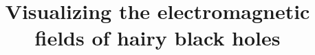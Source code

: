 \documentclass[a4paper]{article}
\title{Visualizing the electromagnetic fields of hairy black holes}
\begin{document}
\newcommand\scalemath[2]{\scalebox{#1}{\mbox{\ensuremath{\displaystyle #2}}}}

%
%
%
%
%
%
%
\end{document}

